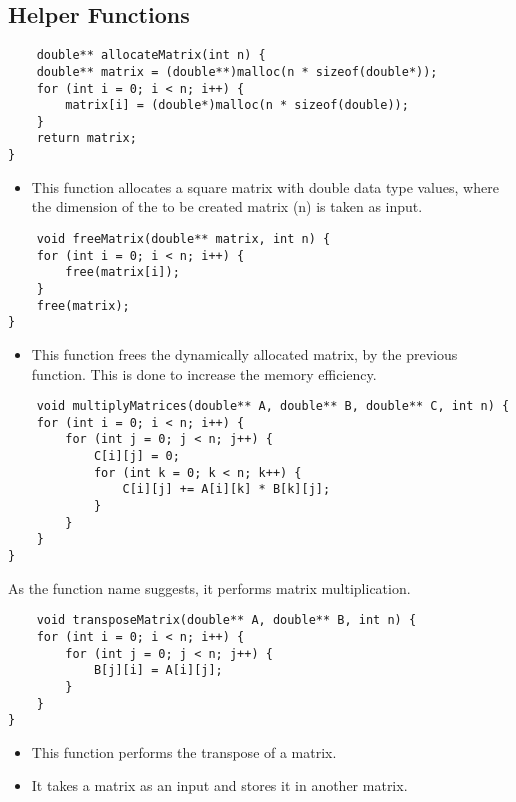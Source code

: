 \documentclass{article}
\begin{document}
\subsection{Helper Functions}
\begin{lstlisting}
    double** allocateMatrix(int n) {
    double** matrix = (double**)malloc(n * sizeof(double*));
    for (int i = 0; i < n; i++) {
        matrix[i] = (double*)malloc(n * sizeof(double));
    }
    return matrix;
}
\end{lstlisting}
\begin{itemize}
\item This function allocates a square matrix with double data type values, where the dimension of the to be created matrix (n) is taken as input.
\end{itemize}
\begin{lstlisting}
    void freeMatrix(double** matrix, int n) {
    for (int i = 0; i < n; i++) {
        free(matrix[i]);
    }
    free(matrix);
}
\end{lstlisting}
\begin{itemize}
\item This function frees the dynamically allocated matrix, by the previous function. This is done to increase the memory efficiency.
\end{itemize}
\begin{lstlisting}
    void multiplyMatrices(double** A, double** B, double** C, int n) {
    for (int i = 0; i < n; i++) {
        for (int j = 0; j < n; j++) {
            C[i][j] = 0;
            for (int k = 0; k < n; k++) {
                C[i][j] += A[i][k] * B[k][j];
            }
        }
    }
}
\end{lstlisting}
As the function name suggests, it performs matrix multiplication.
\begin{lstlisting}
    void transposeMatrix(double** A, double** B, int n) {
    for (int i = 0; i < n; i++) {
        for (int j = 0; j < n; j++) {
            B[j][i] = A[i][j];
        }
    }
}
\end{lstlisting}
\begin{itemize}
\item This function performs the transpose of a matrix.
\item It takes a matrix as an input and stores it in another matrix.
\end{itemize}
\newpage
\end{document}
